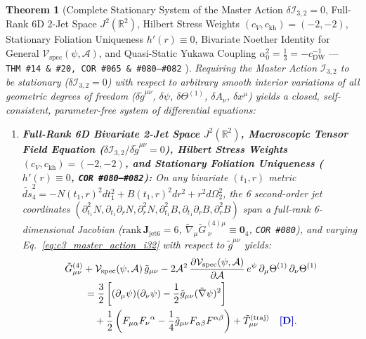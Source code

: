 \documentclass[11pt,a4paper]{article}
\newcommand{\catD}{\text{\textbf{\textcolor{blue!75!black}{[D]}}}}
\theoremstyle{definition}
\theoremstyle{plain}
\newtheorem{theorem}[axiom]{Theorem}
\theoremstyle{remark}
\begin{document}
\begin{theorem}[{Complete Stationary System of the Master Action $\delta\mathcal{I}_{3,2} = 0$, Full-Rank 6D 2-Jet Space $J^2(\mathbb{R}^2)$, Hilbert Stress Weights $(c_V, c_{\mathrm{kh}}) = (-2, -2)$, Stationary Foliation Uniqueness $h'(r) \equiv 0$, Bivariate Noether Identity for General $\mathcal{V}_{\mathrm{spec}}(\psi,\mathcal{A})$, and Quasi-Static Yukawa Coupling $\alpha_0^2 = \frac{1}{3} = -c_{\mathrm{DW}}^{-1}$ --- \texttt{THM~\#14 \& \#20, COR~\#065 \& \#080--\#082} \catD}]\label{thm:c3_master_action_equations}
Requiring the Master Action $\mathcal{I}_{3,2}$ to be stationary ($\delta\mathcal{I}_{3,2} = 0$) with respect to arbitrary smooth interior variations of all geometric degrees of freedom ($\delta\tilde{g}^{\mu\nu}$, $\delta\psi$, $\delta\Theta^{(1)}$, $\delta A_\nu$, $\delta x^\mu$) yields a closed, self-consistent, parameter-free system of differential equations:
\begin{enumerate}[label=(\roman*)]
  \item \textbf{Full-Rank 6D Bivariate 2-Jet Space $J^2(\mathbb{R}^2)$, Macroscopic Tensor Field Equation ($\delta\mathcal{I}_{3,2}/\delta\tilde{g}^{\mu\nu} = 0$), Hilbert Stress Weights $(c_V, c_{\mathrm{kh}}) = (-2, -2)$, and Stationary Foliation Uniqueness ($h'(r) \equiv 0$, \texttt{COR~\#080--\#082}):}
  On any bivariate $(t_1, r)$ metric $\widetilde{ds}_4^2 = -N(t_1, r)^2 dt_1^2 + B(t_1, r)^2 dr^2 + r^2 d\Omega_2^2$, the 6 second-order jet coordinates $(\partial_{t_1}^2 N, \partial_{t_1}\partial_r N, \partial_r^2 N, \partial_{t_1}^2 B, \partial_{t_1}\partial_r B, \partial_r^2 B)$ span a full-rank 6-dimensional Jacobian ($\mathrm{rank}\,\mathbf{J}_{\mathrm{jet6}} = 6$, $\tilde{\nabla}_\mu\tilde{G}^{(4)\mu}_{\;\nu} \equiv \mathbf{0}_4$, \texttt{COR~\#080}), and varying Eq.~\eqref{eq:c3_master_action_i32} with respect to $\tilde{g}^{\mu\nu}$ yields:
  \begin{equation}\label{eq:c3_master_tensor_eq}
    \begin{aligned}
    &\tilde{G}_{\mu\nu}^{(4)} + \mathcal{V}_{\mathrm{spec}}(\psi, \mathcal{A})\,\tilde{g}_{\mu\nu} - 2\mathcal{A}^2\,\frac{\partial\mathcal{V}_{\mathrm{spec}}(\psi, \mathcal{A})}{\partial\mathcal{A}}\,e^\psi\,\partial_\mu\Theta^{(1)}\,\partial_\nu\Theta^{(1)} \\
    &\qquad = \frac{3}{2}\left[(\partial_\mu\psi)(\partial_\nu\psi) - \frac{1}{2}\tilde{g}_{\mu\nu}(\tilde{\nabla}\psi)^2\right] \\
    &\qquad\quad + \frac{1}{2}\left(F_{\mu\alpha}{F_\nu}^\alpha - \frac{1}{4}\tilde{g}_{\mu\nu}F_{\alpha\beta}F^{\alpha\beta}\right) + \tilde{T}_{\mu\nu}^{(\mathrm{traj})} \quad \catD.

\end{aligned}
\end{equation}
\end{enumerate}
\end{theorem}
\end{document}
